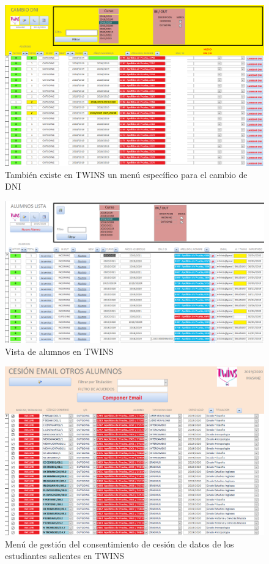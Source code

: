 \begin{figure}
	\includegraphics[width=\textwidth]{img/Capturas de TWINS/cambioDNI.png}
	\caption[Menú de cambio de DNI]{También existe en TWINS un menú específico para el cambio de DNI}
	\label{fig:cambioDNI}
\end{figure}

\begin{figure}
	\includegraphics[width=\textwidth]{img/Capturas de TWINS/alumnos.png}
	\caption{Vista de alumnos en TWINS}
	\label{fig:alumnos}
\end{figure}

\begin{figure}
	\includegraphics[width=\textwidth]{img/Capturas de TWINS/cesionDeDatos.png}
	\caption[Consentimiento de datos en TWINS]{Menú de gestión del consentimiento de cesión de datos de los estudiantes salientes en TWINS}
	\label{fig:cesionDeDatos}
\end{figure}

